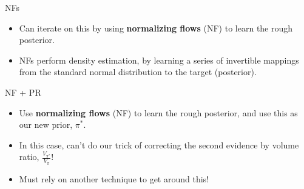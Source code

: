 \documentclass[aspectratio=169]{beamer}
\begin{document}
\begin{frame}{NFs}
    \begin{itemize}\vspace{3em}

    \item<1-> Can iterate on this by using \textbf{normalizing flows} (NF) to learn the rough posterior.
    \item<2-> NFs perform density estimation, by learning a series of invertible mappings from the standard normal distribution to the target (posterior). 
\end{itemize}\vspace{0em}
\end{frame}

\begin{frame}{NF + PR}
\begin{itemize}\vspace{1em}
    \item<1-> Use \textbf{normalizing flows} (NF) to learn the rough posterior, and use this as our new prior, $\pi^\ast$.
    \item<1-> In this case, can't do our trick of correcting the second evidence by volume ratio, $\frac{V_{\pi^\ast}}{V_{\pi}}$!
    \item<1-> Must rely on another technique to get around this!
\end{itemize}\vspace{2em}
\hspace{2em}\vfill
\begin{minipage}{1\textwidth}
\end{minipage}
\end{frame}
\end{document}
